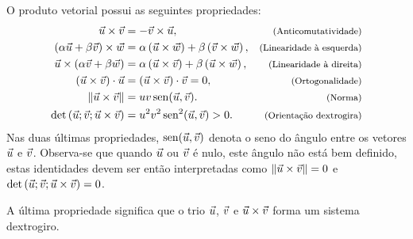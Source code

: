O produto vetorial possui as seguintes propriedades:
\begin{subequations}\label{propprodvec}
\begin{align}
\vec{u}\times\vec{v}&=-\vec{v}\times\vec{u},&\hbox{\footnotesize (Anticomutatividade)}\label{propprodvecanticom}\\
\left(\alpha \vec{u}+ \beta\vec{v}\right)\times\vec{w}&=\alpha\left(\vec{u}\times\vec{w}\right)+\beta\left(\vec{v}\times\vec{w}\right),&\hbox{\footnotesize (Linearidade à esquerda)}\label{propprodveclin1}\\
\vec{u}\times\left(\alpha \vec{v}+ \beta\vec{w}\right)&=\alpha\left(\vec{u}\times\vec{v}\right)+\beta\left(\vec{u}\times\vec{w}\right),&\hbox{\footnotesize (Linearidade à direita)}\label{propprodveclin2}\\
\left(\vec{u}\times \vec{v}\right)\cdot \vec{u}&=\left(\vec{u}\times \vec{v}\right)\cdot \vec{v}=0,&\hbox{\footnotesize (Ortogonalidade)}\label{propprodvecorto}\\
\left\|\vec{u}\times \vec{v}\right\|&=uv\operatorname{sen}(\vec{u},\vec{v})
.&\hbox{\footnotesize (Norma)}\label{propprodvecnorma}\\
\det\left(\vec{u}; \vec{v};\vec{u}\times \vec{v}\right)&=u^2v^2\operatorname{sen}^2(\vec{u},\vec{v})>0
.&\hbox{\footnotesize (Orientação dextrogira)}\label{propprodvecorient}
\end{align}
\end{subequations}
Nas duas últimas propriedades, $\operatorname{sen}(\vec{u},\vec{v})$ denota o seno do ângulo entre os vetores $\vec{u}$ e $\vec{v}$. Observa-se que quando $\vec{u}$ ou $\vec{v}$ é nulo, este ângulo não está bem definido, estas identidades devem ser então interpretadas como $\left\|\vec{u}\times \vec{v}\right\|=0$ e $\det\left(\vec{u}; \vec{v};\vec{u}\times \vec{v}\right)=0$.

A última propriedade significa que o trio $\vec{u}$, $\vec{v}$ e $\vec{u}\times\vec{v}$ forma um sistema dextrogiro.

